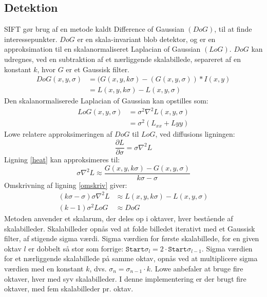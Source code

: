 \subsection{Detektion}
SIFT gør brug af en metode kaldt Difference of Gaussian $(DoG)$, til at finde interessepunkter. $DoG$ er en skala-invariant blob detektor, og er en approksimation til en skalanormaliseret Laplacian of Gaussian $(LoG)$. $DoG$ kan udregnes, ved en subtraktion af et nærliggende skalabillede, separeret af en konstant $k$, hvor $G$ er et Gaussisk filter.
\begin{equation}
\begin{split}
DoG(x,y,\sigma) &= (G(x,y,k\sigma)-(G(x,y,\sigma))\ast I(x,y) \\
           &= L(x,y,k \sigma)-L(x,y,\sigma)
\end{split}
\label{dog}
\end{equation}
Den skalanormaliserede Laplacian of Gaussian kan opstilles som:
\begin{equation}
\begin{split}
LoG(x,y,\sigma)&=\sigma^2\nabla^2L(x,y,\sigma) \\
&= \sigma^2(L_{xx}+L{yy})
\end{split}
\end{equation}
Lowe relatere approksimeringen af $DoG$ til $LoG$, ved diffusions ligningen:
\begin{equation}
\dfrac{\partial L}{\partial \sigma} = \sigma \nabla^2L
\label{heat}
\end{equation}
Ligning \eqref{heat} kan approksimeres til:
\begin{equation}
\sigma \nabla^2L \approx \frac{G(x,y,k\sigma) - G(x,y,\sigma)}{k\sigma-\sigma}
\label{omskriv}
\end{equation}
Omskrivning af ligning \eqref{omskriv} giver:
\begin{equation}
\begin{split}
(k\sigma-\sigma)\sigma\nabla^2L &\approx L(x,y,k\sigma)-L(x,y,\sigma) \\
(k-1)\sigma^2LoG &\approx DoG
\end{split}
\end{equation}
Metoden anvender et skalarum, der deles op i oktaver, hver bestående af skalabilleder. Skalabilleder opnås ved at folde billedet iterativt med et Gaussisk filter, af stigende sigma værdi. Sigma værdien for første skalabillede, for en given oktav $l$ er dobbelt så stor som forrige: $\texttt{Start} \sigma_l = 2 \cdot \texttt{Start} \sigma_{l-1}$. Sigma værdien for et nærliggende skalabillede på samme oktav, opnås ved at multiplicere sigma værdien med en konstant $k$, dvs. $\sigma_n = \sigma_{n-1} \cdot k$. Lowe anbefaler at bruge fire oktaver, hver med syv skalabilleder. I denne implementering er der brugt fire oktaver, med fem skalabilleder pr. oktav.

